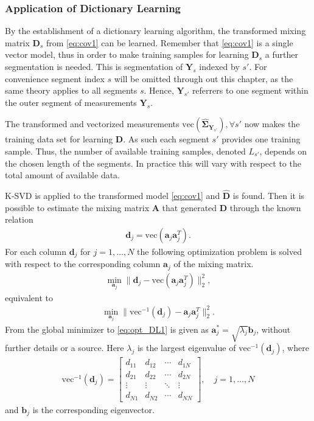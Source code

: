 \subsubsection{Application of Dictionary Learning}
By the establishment of a dictionary learning algorithm, the transformed mixing matrix $\mathbf{D}_s$ from \eqref{eq:cov1} can be learned. 
Remember that \eqref{eq:cov1} is a single vector model, thus in order to make training samples for learning $\mathbf{D}_s$ a further segmentation is needed.
This is segmentation of $\mathbf{Y}_s$ indexed by $s'$. 
For convenience segment index $s$ will be omitted through out this chapter, as the same theory applies to all segments $s$.
Hence, $\mathbf{Y}_{s'}$ referrers to one segment within the outer segment of measurements $\mathbf{Y}_s$. 
   
The transformed and vectorized measurements $\text{vec} \left( \widehat{\boldsymbol{\Sigma}}_{\mathbf{Y}_{s'}} \right), \forall s'$ now makes the training data set for learning $\mathbf{D}$. 
As such each segment $s'$ provides one training sample. 
Thus, the number of available training samples, denoted $L_{s'}$, depends on the chosen length of the segments. In practice this will vary with respect to the total amount of available data. 

K-SVD is applied to the transformed model \eqref{eq:cov1} and $\hat{\mathbf{D}}$ is found. Then it is possible to estimate the mixing matrix $\mathbf{A}$ that generated $\mathbf{D}$ through the known relation 
\begin{align*}
\mathbf{d}_j = \text{vec}(\mathbf{a}_j \mathbf{a}_j^T).
\end{align*}
For each column $\mathbf{d}_j$ for $j = 1, \dots, N$ the following optimization problem is solved with respect to the corresponding column $\mathbf{a}_j$ of the mixing matrix.
\begin{align*}
\min_{\mathbf{a}_j} \| \mathbf{d}_j -\text{vec}\left(\mathbf{a}_j \mathbf{a}_j^T\right) \|_2^2, 
\end{align*}
equivalent to 
\begin{align}
\min_{\mathbf{a}_j} \| \text{vec}^{-1}(\mathbf{d}_j) - \mathbf{a}_j \mathbf{a}_j^T\|_2^2. \label{eq:opt_DL1}
\end{align}
From \cite{Balkan2015} the global minimizer to \eqref{eq:opt_DL1} is given as $\mathbf{a}^{\ast}_j=\sqrt{\lambda_j} \mathbf{b}_j$, without further details or a source.  
Here $\lambda_j$ is the largest eigenvalue of $\text{vec}^{-1}(\mathbf{d}_j)$, where
\begin{align*}
\text{vec}^{-1}(\mathbf{d}_j) = 
\begin{bmatrix}
d_{11} & d_{12} & \cdots & d_{1N} \\
d_{21} & d_{22} & \cdots & d_{2N} \\
\vdots & \vdots & \ddots & \vdots \\
d_{N1} & d_{N2} & \cdots & d_{NN}
\end{bmatrix}, \quad j =1, \dots, N
\end{align*}
and $\mathbf{b}_j$ is the corresponding eigenvector.

